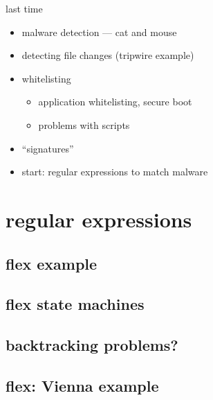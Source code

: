 \date{}
\title{}
\date{}

\begin{frame}
    \titlepage
\end{frame}



\begin{frame}{last time}
    \begin{itemize}
    \item malware detection --- cat and mouse
    \item detecting file changes (tripwire example)
    \item whitelisting
        \begin{itemize}
        \item application whitelisting, secure boot
        \item problems with scripts
        \end{itemize}
    \item ``signatures''
    \item start: regular expressions to match malware
    \end{itemize}
\end{frame}

\section{regular expressions}


\subsection{flex example}


\subsection{flex state machines}




\subsection{backtracking problems?}




\subsection{flex: Vienna example}


